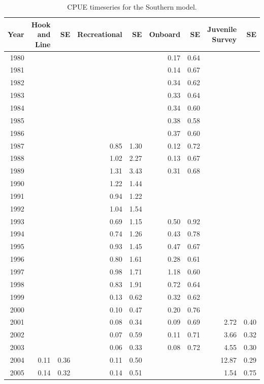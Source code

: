 \documentclass[12pt,]{article}
\begin{document}
\begin{table}[ht]
\centering
\caption{CPUE timeseries for the Southern model.} 
\label{tab:Southern_CPUE}
\begin{tabular}{rrrrrrrrr}
  \hline
Year & Hook and Line & SE & Recreational & SE & Onboard & SE & Juvenile Survey & SE \\ 
  \hline
1980 &  &  &  &  & 0.17 & 0.64 &  &  \\ 
  1981 &  &  &  &  & 0.14 & 0.67 &  &  \\ 
  1982 &  &  &  &  & 0.34 & 0.62 &  &  \\ 
  1983 &  &  &  &  & 0.33 & 0.64 &  &  \\ 
  1984 &  &  &  &  & 0.34 & 0.60 &  &  \\ 
  1985 &  &  &  &  & 0.38 & 0.58 &  &  \\ 
  1986 &  &  &  &  & 0.37 & 0.60 &  &  \\ 
  1987 &  &  & 0.85 & 1.30 & 0.12 & 0.72 &  &  \\ 
  1988 &  &  & 1.02 & 2.27 & 0.13 & 0.67 &  &  \\ 
  1989 &  &  & 1.31 & 3.43 & 0.31 & 0.68 &  &  \\ 
  1990 &  &  & 1.22 & 1.44 &  &  &  &  \\ 
  1991 &  &  & 0.94 & 1.22 &  &  &  &  \\ 
  1992 &  &  & 1.04 & 1.54 &  &  &  &  \\ 
  1993 &  &  & 0.69 & 1.15 & 0.50 & 0.92 &  &  \\ 
  1994 &  &  & 0.74 & 1.26 & 0.43 & 0.78 &  &  \\ 
  1995 &  &  & 0.93 & 1.45 & 0.47 & 0.67 &  &  \\ 
  1996 &  &  & 0.80 & 1.61 & 0.28 & 0.61 &  &  \\ 
  1997 &  &  & 0.98 & 1.71 & 1.18 & 0.60 &  &  \\ 
  1998 &  &  & 0.83 & 1.91 & 0.72 & 0.64 &  &  \\ 
  1999 &  &  & 0.13 & 0.62 & 0.32 & 0.62 &  &  \\ 
  2000 &  &  & 0.10 & 0.47 & 0.20 & 0.76 &  &  \\ 
  2001 &  &  & 0.08 & 0.34 & 0.09 & 0.69 & 2.72 & 0.40 \\ 
  2002 &  &  & 0.07 & 0.59 & 0.11 & 0.71 & 3.66 & 0.32 \\ 
  2003 &  &  & 0.06 & 0.33 & 0.08 & 0.72 & 4.55 & 0.30 \\ 
  2004 & 0.11 & 0.36 & 0.11 & 0.50 &  &  & 12.87 & 0.29 \\ 
  2005 & 0.14 & 0.32 & 0.14 & 0.51 &  &  & 1.54 & 0.75 \\ 

\end{tabular}
\end{table}
\end{document}
